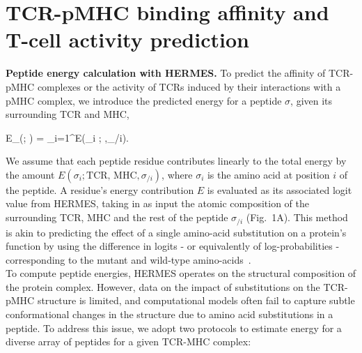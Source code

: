 

\section{TCR-pMHC binding affinity and T-cell activity prediction}
\label{sec:aff_act}

\noindent \textbf{Peptide energy calculation with HERMES.} To predict the affinity of TCR-pMHC
complexes or the activity of TCRs induced by their interactions with a pMHC complex, we introduce
the predicted energy for a peptide $\sigma$, given its surrounding TCR and MHC,

\EQ
E_{}(\sigma; ) = \sum_{i=1}^\ell E(\sigma_i ; ,\sigma_{/i}).
\label{eq:pepEn}\EE

\noindent We assume that each peptide residue contributes linearly to the total energy by the amount
$E(\sigma_i ; \text{TCR, MHC}, \sigma_{/i})$, where $\sigma_i$ is the amino acid at position $i$ of
the peptide. A residue's energy contribution $E$ is evaluated as its associated logit value from
HERMES, taking in as input the atomic composition of the surrounding TCR, MHC and the rest of the
peptide $\sigma_{/i}$ (Fig.~1A). This method is akin to predicting the effect of a single amino-acid
substitution on a protein's function by using the difference in logits - or equivalently of
log-probabilities - corresponding to the mutant and wild-type amino-acids~\cite{Visani2024-sh}.\\

To compute peptide energies, HERMES operates on the structural composition of the protein complex.
However, data on the impact of substitutions on the TCR-pMHC structure is limited, and computational
models often fail to capture subtle conformational changes in the structure due to amino acid
substitutions in a peptide. To address this issue, we adopt two protocols to estimate energy for a
diverse array of peptides for a given TCR-MHC complex:

